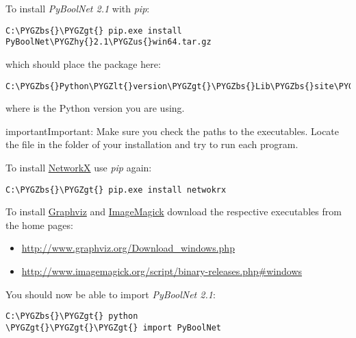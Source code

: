 \documentclass[letterpaper,10pt,english]{sphinxmanual}
\def\PYGZbs{\char`\\}
\def\PYGZus{\char`\_}
\def\PYGZlt{\char`\<}
\def\PYGZgt{\char`\>}
\def\PYGZhy{\char`\-}
\begin{document}
To install \emph{PyBoolNet 2.1} with \emph{pip}:

\begin{Verbatim}[commandchars=\\\{\}]
C:\PYGZbs{}\PYGZgt{} pip.exe install PyBoolNet\PYGZhy{}2.1\PYGZus{}win64.tar.gz
\end{Verbatim}

which should place the package here:

\begin{Verbatim}[commandchars=\\\{\}]
C:\PYGZbs{}Python\PYGZlt{}version\PYGZgt{}\PYGZbs{}Lib\PYGZbs{}site\PYGZhy{}packages
\end{Verbatim}

where  is the Python version you are using.

\begin{notice}{important}{Important:}
Make sure you check the paths to the executables. Locate the file  in the  folder of your installation and
try to run each program.
\end{notice}

To install \href{https://networkx.github.io/}{NetworkX} use \emph{pip} again:

\begin{Verbatim}[commandchars=\\\{\}]
C:\PYGZbs{}\PYGZgt{} pip.exe install netwokrx
\end{Verbatim}

To install \href{http://www.graphviz.org/}{Graphviz} and \href{http://www.imagemagick.org/script/index.php}{ImageMagick} download the respective executables from the home pages:
\begin{itemize}
\item {} 
\href{http://www.graphviz.org/Download\_windows.php}{http://www.graphviz.org/Download\_windows.php}

\item {} 
\href{http://www.imagemagick.org/script/binary-releases.php\#windows}{http://www.imagemagick.org/script/binary-releases.php\#windows}

\end{itemize}

You should now be able to import \emph{PyBoolNet 2.1}:

\begin{Verbatim}[commandchars=\\\{\}]
C:\PYGZbs{}\PYGZgt{} python
\PYGZgt{}\PYGZgt{}\PYGZgt{} import PyBoolNet
\end{Verbatim}
\end{document}
